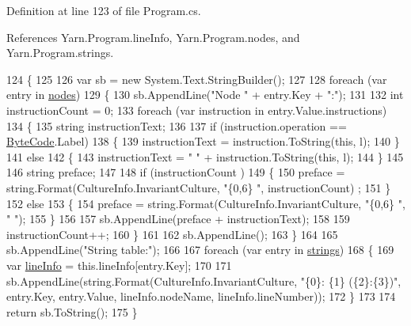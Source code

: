 Definition at line 123 of file Program.\-cs.



References Yarn.\-Program.\-line\-Info, Yarn.\-Program.\-nodes, and Yarn.\-Program.\-strings.


\begin{DoxyCode}
124         \{
125 
126             var sb = \textcolor{keyword}{new} System.Text.StringBuilder();
127 
128             \textcolor{keywordflow}{foreach} (var entry \textcolor{keywordflow}{in} \hyperlink{a00140_a3f4928a577c88263ad016be259b175c4}{nodes})
129             \{
130                 sb.AppendLine(\textcolor{stringliteral}{"Node "} + entry.Key + \textcolor{stringliteral}{":"});
131 
132                 \textcolor{keywordtype}{int} instructionCount = 0;
133                 \textcolor{keywordflow}{foreach} (var instruction \textcolor{keywordflow}{in} entry.Value.instructions)
134                 \{
135                     \textcolor{keywordtype}{string} instructionText;
136 
137                     \textcolor{keywordflow}{if} (instruction.operation == \hyperlink{a00050_ad5dfb6ee68ca7469623ad3e459f98894}{ByteCode}.Label)
138                     \{
139                         instructionText = instruction.ToString(\textcolor{keyword}{this}, l);
140                     \}
141                     \textcolor{keywordflow}{else}
142                     \{
143                         instructionText = \textcolor{stringliteral}{"    "} + instruction.ToString(\textcolor{keyword}{this}, l);
144                     \}
145 
146                     \textcolor{keywordtype}{string} preface;
147 
148                     \textcolor{keywordflow}{if} (instructionCount %
      )
149                     \{
150                         preface = string.Format(CultureInfo.InvariantCulture, \textcolor{stringliteral}{"\{0,6\}   "}, instructionCount)
      ;
151                     \}
152                     \textcolor{keywordflow}{else}
153                     \{
154                         preface = string.Format(CultureInfo.InvariantCulture, \textcolor{stringliteral}{"\{0,6\}   "}, \textcolor{stringliteral}{" "});
155                     \}
156 
157                     sb.AppendLine(preface + instructionText);
158 
159                     instructionCount++;
160                 \}
161 
162                 sb.AppendLine();
163             \}
164 
165             sb.AppendLine(\textcolor{stringliteral}{"String table:"});
166 
167             \textcolor{keywordflow}{foreach} (var entry \textcolor{keywordflow}{in} \hyperlink{a00140_a59263e00cecfe36d9881b4c30b048f09}{strings})
168             \{
169                 var \hyperlink{a00140_a0d4da395947767b4a1eaaff8a9842adc}{lineInfo} = this.lineInfo[entry.Key];
170 
171                 sb.AppendLine(string.Format(CultureInfo.InvariantCulture, \textcolor{stringliteral}{"\{0\}: \{1\} (\{2\}:\{3\})"}, entry.Key, 
      entry.Value, lineInfo.nodeName, lineInfo.lineNumber));
172             \}
173 
174             \textcolor{keywordflow}{return} sb.ToString();
175         \}
\end{DoxyCode}
